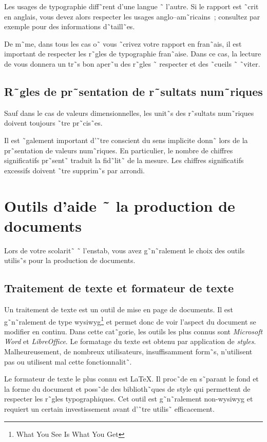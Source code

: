 Les usages de typographie diff˜rent d'une langue ˜ l'autre. Si le rapport est
˜crit en anglais, vous devez alors respecter les usages
anglo--am˜ricains~; consultez par exemple \cite{typoUS} pour des
informations d˜taill˜es. 

De m˜me, dans tous les cas o˜ vous ˜crivez votre rapport en
fran˜ais, il est important de respecter les r˜gles de typographie fran˜aise.
Dans ce cas,
la lecture de \cite{andreTypo} vous donnera un tr˜s bon aper˜u des r˜gles
˜ respecter et des ˜cueils ˜ ˜viter.

\subsection{R˜gles de pr˜sentation de r˜sultats num˜riques}

Sauf dans le cas de valeurs dimensionnelles, les unit˜s des r˜sultats
num˜riques doivent toujours ˜tre pr˜cis˜es. 

Il est ˜galement important d'˜tre conscient du sens implicite donn˜ lors de la
pr˜sentation de valeurs num˜riques. En particulier, le nombre de chiffres
significatifs pr˜sent˜ traduit la fid˜lit˜ de la mesure. Les chiffres
significatifs excessifs doivent ˜tre supprim˜s par arrondi.

\section{Outils d'aide ˜ la production de documents}
\label{sec:outils}

Lors de votre scolarit˜ ˜ l'\gls{enstab}, vous avez g˜n˜ralement le
choix des outils utilis˜s pour la production de documents. 

\subsection{Traitement de texte et formateur de texte}

Un traitement de texte est un outil de mise en page de documents. Il est
g˜n˜ralement de type \gls{wysiwyg}\footnote{What You See Is What You Get}
et permet donc de voir l'aspect du document se modifier en continu. Dans cette
cat˜gorie, les outils les plus connus sont \emph{Microsoft Word} et
\emph{LibreOffice}. Le formatage du texte est
obtenu par application de {\em styles}. Malheureusement, de nombreux
utilisateurs, insuffisamment form˜s, n'utilisent pas ou utilisent mal
cette fonctionnalit˜.

Le formateur de texte le plus connu est \LaTeX. Il proc˜de en s˜parant le fond
et la forme du document et poss˜de des biblioth˜ques de style qui permettent
de respecter les r˜gles typographiques. Cet outil est g˜n˜ralement
non-\gls{wysiwyg} et requiert un certain investissement avant d'˜tre
utilis˜ efficacement.

